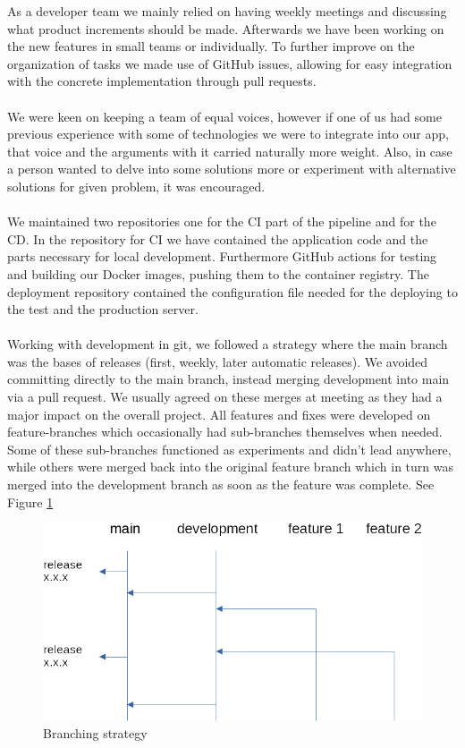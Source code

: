 \documentclass[12pt]{article}
\begin{document}
As a developer team we mainly relied on having weekly meetings and discussing what product increments should be made. Afterwards we have been working on the new features in small teams or individually. To further improve on the organization of tasks we made use of GitHub issues, allowing for easy integration with the concrete implementation through pull requests.
\\\\
We were keen on keeping a team of equal voices, however if one of us had some previous experience with some of technologies we were to integrate into our app, that voice and the arguments with it carried naturally more weight. Also, in case a person wanted to delve into some solutions more or experiment with alternative solutions for given problem, it was encouraged. 
\\\\
We maintained two repositories one for the CI part of the pipeline and for the CD. In the repository for CI we have contained the application code and the parts necessary for local development. Furthermore GitHub actions for testing and building our Docker images, pushing them to the container registry. The deployment repository contained the configuration file needed for the deploying to the test and the production server.
\\\\
Working with development in git, we followed a strategy where the main branch was the bases of releases (first, weekly, later automatic releases). We avoided committing directly to the main branch, instead merging development into main via a pull request. We usually agreed on these merges at meeting as they had a major impact on the overall project. All features and fixes were developed on feature-branches which occasionally had sub-branches themselves when needed. Some of these sub-branches functioned as experiments and didn't lead anywhere, while others were merged back into the original feature branch which in turn was merged into the development branch as soon as the feature was complete. See Figure \ref{fig:branching}
\begin{figure}[h!]
    \centering
    \includegraphics[width=12cm]{figures/branching.png}
    \caption{Branching strategy}
    \label{fig:branching}
\end{figure}
\end{document}
